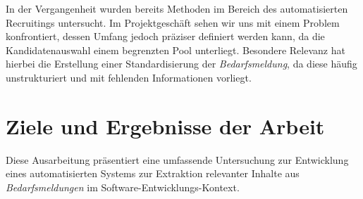 In der Vergangenheit wurden bereits Methoden im Bereich des automatisierten Recruitings untersucht. Im Projektgeschäft sehen wir uns mit einem Problem konfrontiert, dessen Umfang jedoch präziser definiert werden kann, da die Kandidatenauswahl einem begrenzten Pool unterliegt. Besondere Relevanz hat hierbei die Erstellung einer Standardisierung der \emph{Bedarfsmeldung}, da diese häufig unstrukturiert und mit fehlenden Informationen vorliegt.
\section{Ziele und Ergebnisse der Arbeit}
\label{sec:zieleundergebnis}
Diese Ausarbeitung präsentiert eine umfassende Untersuchung zur Entwicklung eines automatisierten Systems zur Extraktion relevanter Inhalte aus \emph{Bedarfsmeldungen} im Software-Entwicklungs-Kontext.
